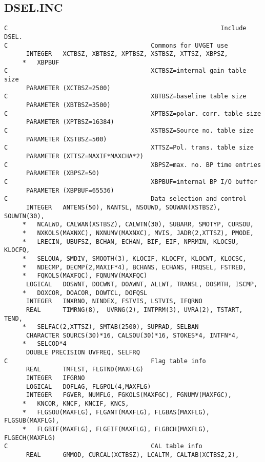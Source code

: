 \subsection{DSEL.INC
}
\begin{verbatim}
C                                                          Include DSEL.
C                                       Commons for UVGET use
      INTEGER   XCTBSZ, XBTBSZ, XPTBSZ, XSTBSZ, XTTSZ, XBPSZ,
     *   XBPBUF
C                                       XCTBSZ=internal gain table size
      PARAMETER (XCTBSZ=2500)
C                                       XBTBSZ=baseline table size
      PARAMETER (XBTBSZ=3500)
C                                       XPTBSZ=polar. corr. table size
      PARAMETER (XPTBSZ=16384)
C                                       XSTBSZ=Source no. table size
      PARAMETER (XSTBSZ=500)
C                                       XTTSZ=Pol. trans. table size
      PARAMETER (XTTSZ=MAXIF*MAXCHA*2)
C                                       XBPSZ=max. no. BP time entries
      PARAMETER (XBPSZ=50)
C                                       XBPBUF=internal BP I/O buffer
      PARAMETER (XBPBUF=65536)
C                                       Data selection and control
      INTEGER   ANTENS(50), NANTSL, NSOUWD, SOUWAN(XSTBSZ), SOUWTN(30),
     *   NCALWD, CALWAN(XSTBSZ), CALWTN(30), SUBARR, SMOTYP, CURSOU,
     *   NXKOLS(MAXNXC), NXNUMV(MAXNXC), MVIS, JADR(2,XTTSZ), PMODE,
     *   LRECIN, UBUFSZ, BCHAN, ECHAN, BIF, EIF, NPRMIN, KLOCSU, KLOCFQ,
     *   SELQUA, SMDIV, SMOOTH(3), KLOCIF, KLOCFY, KLOCWT, KLOCSC,
     *   NDECMP, DECMP(2,MAXIF*4), BCHANS, ECHANS, FRQSEL, FSTRED,
     *   FQKOLS(MAXFQC), FQNUMV(MAXFQC)
      LOGICAL   DOSWNT, DOCWNT, DOAWNT, ALLWT, TRANSL, DOSMTH, ISCMP,
     *   DOXCOR, DOACOR, DOWTCL, DOFQSL
      INTEGER   INXRNO, NINDEX, FSTVIS, LSTVIS, IFQRNO
      REAL      TIMRNG(8),  UVRNG(2), INTPRM(3), UVRA(2), TSTART, TEND,
     *   SELFAC(2,XTTSZ), SMTAB(2500), SUPRAD, SELBAN
      CHARACTER SOURCS(30)*16, CALSOU(30)*16, STOKES*4, INTFN*4,
     *   SELCOD*4
      DOUBLE PRECISION UVFREQ, SELFRQ
C                                       Flag table info
      REAL      TMFLST, FLGTND(MAXFLG)
      INTEGER   IFGRNO
      LOGICAL   DOFLAG, FLGPOL(4,MAXFLG)
      INTEGER   FGVER, NUMFLG, FGKOLS(MAXFGC), FGNUMV(MAXFGC),
     *   KNCOR, KNCF, KNCIF, KNCS,
     *   FLGSOU(MAXFLG), FLGANT(MAXFLG), FLGBAS(MAXFLG), FLGSUB(MAXFLG),
     *   FLGBIF(MAXFLG), FLGEIF(MAXFLG), FLGBCH(MAXFLG), FLGECH(MAXFLG)
C                                       CAL table info
      REAL      GMMOD, CURCAL(XCTBSZ), LCALTM, CALTAB(XCTBSZ,2),

\end{verbatim}
